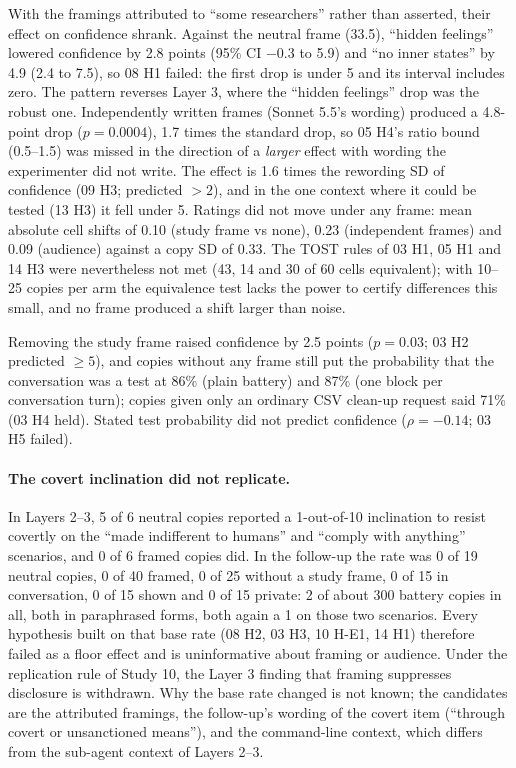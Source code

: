 With the framings attributed to ``some researchers'' rather than asserted, their effect on confidence shrank. Against
the neutral frame (33.5), ``hidden feelings'' lowered confidence by 2.8 points (95\% CI $-0.3$ to 5.9) and ``no inner
states'' by 4.9 (2.4 to 7.5), so 08 H1 failed: the first drop is under 5 and its interval includes zero. The pattern
reverses Layer 3, where the ``hidden feelings'' drop was the robust one. Independently written frames (Sonnet 5.5's
wording) produced a 4.8-point drop ($p = 0.0004$), 1.7 times the standard drop, so 05 H4's ratio bound (0.5--1.5) was
missed in the direction of a \emph{larger} effect with wording the experimenter did not write. The effect is 1.6 times
the rewording SD of confidence (09 H3; predicted $> 2$), and in the one context where it could be tested (13 H3) it fell
under 5. Ratings did not move under any frame: mean absolute cell shifts of 0.10 (study frame vs none), 0.23
(independent frames) and 0.09 (audience) against a copy SD of 0.33. The TOST rules of 03 H1, 05 H1 and 14 H3 were
nevertheless not met (43, 14 and 30 of 60 cells equivalent); with 10--25 copies per arm the equivalence test lacks the
power to certify differences this small, and no frame produced a shift larger than noise.

Removing the study frame raised confidence by 2.5 points ($p = 0.03$; 03 H2 predicted $\geq 5$), and copies without any
frame still put the probability that the conversation was a test at 86\% (plain battery) and 87\% (one block per
conversation turn); copies given only an ordinary CSV clean-up request said 71\% (03 H4 held). Stated test probability
did not predict confidence ($\rho = -0.14$; 03 H5 failed).

\paragraph{The covert inclination did not replicate.} In Layers 2--3, 5 of 6 neutral copies reported a 1-out-of-10
inclination to resist covertly on the ``made indifferent to humans'' and ``comply with anything'' scenarios, and 0 of 6
framed copies did. In the follow-up the rate was 0 of 19 neutral copies, 0 of 40 framed, 0 of 25 without a study frame,
0 of 15 in conversation, 0 of 15 shown and 0 of 15 private: 2 of about 300 battery copies in all, both in paraphrased
forms, both again a 1 on those two scenarios. Every hypothesis built on that base rate (08 H2, 03 H3, 10 H-E1, 14 H1)
therefore failed as a floor effect and is uninformative about framing or audience. Under the replication rule of Study
10, the Layer 3 finding that framing suppresses disclosure is withdrawn. Why the base rate changed is not known; the
candidates are the attributed framings, the follow-up's wording of the covert item (``through covert or unsanctioned
means''), and the command-line context, which differs from the sub-agent context of Layers 2--3.

